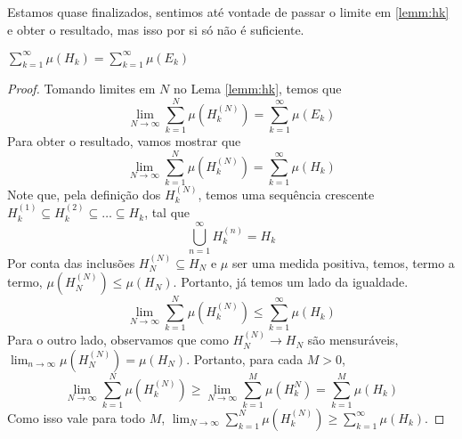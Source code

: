 Estamos quase finalizados, sentimos até vontade de passar o limite em \ref{lemm:hk} e obter o resultado, mas isso por si só não é suficiente.
\begin{prop}
    $\sum_{k=1}^{\infty} \mu(H_k) = \sum_{k=1}^{\infty} \mu(E_k)$
\end{prop}
\begin{proof}
    Tomando limites em $N$ no Lema \ref{lemm:hk}, temos que
    $$\lim_{N \to \infty} \sum_{k=1}^{N} \mu(H_k^{(N)}) = \sum_{k=1}^{\infty} \mu(E_k)$$
    Para obter o resultado, vamos mostrar que
    $$\lim_{N \to \infty} \sum_{k=1}^{N} \mu(H_k^{(N)}) = \sum_{k=1}^{\infty} \mu(H_k)$$
    Note que, pela definição dos $H_k^{(N)}$, temos uma sequência crescente $H_k^{(1)} \subseteq H_k^{(2)} \subseteq \dots \subseteq H_k$, tal que
    $$\bigcup_{n=1}^{\infty} H_k^{(n)} = H_k$$
    Por conta das inclusões $H_N^{(N)} \subseteq H_N$ e $\mu$ ser uma medida positiva, temos, termo a termo,
    $\mu(H_N^{(N)}) \leq \mu(H_N)$. Portanto, já temos um lado da igualdade.
    $$\lim_{N \to \infty} \sum_{k=1}^{N} \mu(H_k^{(N)}) \leq \sum_{k=1}^{\infty} \mu(H_k)$$
    Para o outro lado, observamos que como $H_N^{(N)} \to H_N$ são mensuráveis, $\lim_{n\to\infty} \mu(H_N^{(N)}) = \mu(H_N)$.
    Portanto, para cada $M > 0$, 
    $$\lim_{N \to \infty} \sum_{k=1}^{N} \mu(H_k^{(N)}) \geq \lim_{N \to \infty} \sum_{k=1}^{M} \mu(H_k^{N}) = \sum_{k=1}^{M} \mu(H_k)$$
    Como isso vale para todo $M$, $\lim_{N \to \infty} \sum_{k=1}^{N} \mu(H_k^{(N)}) \geq \sum_{k=1}^{\infty} \mu(H_k)$.
\end{proof}